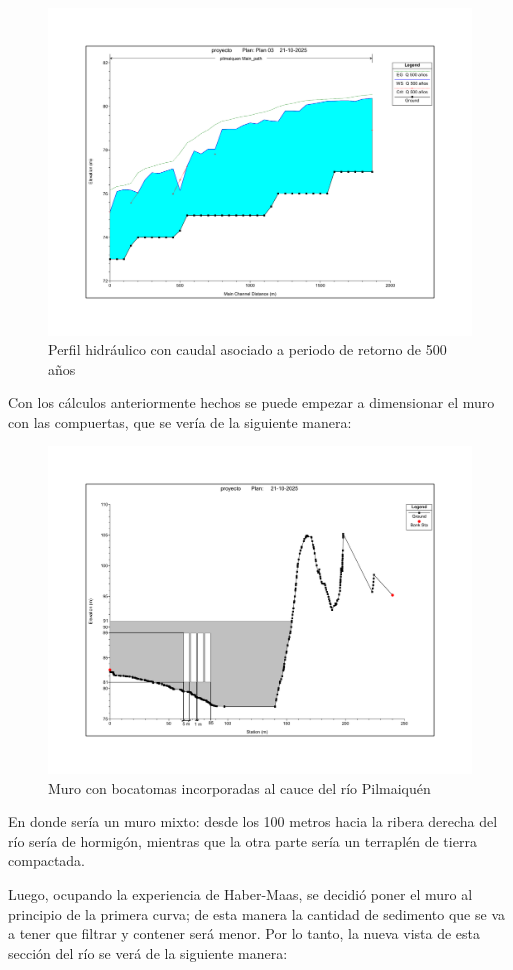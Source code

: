 \documentclass{article} %
\begin{document}
\begin{figure}[H]
    \centering
    \includegraphics[width=0.6\linewidth]{imagenes/perfil_500_sb.pdf}
    \caption{Perfil hidráulico con caudal asociado a periodo de retorno de 500 años}
\end{figure}

Con los cálculos anteriormente hechos se puede empezar a dimensionar el muro con las compuertas, que se vería de la siguiente manera:

\begin{figure}[H]
    \centering
    \includegraphics[width=0.8\linewidth]{imagenes/muro.pdf}
    \caption{Muro con bocatomas incorporadas al cauce del río Pilmaiquén}
\end{figure}

En donde sería un muro mixto: desde los 100 metros hacia la ribera derecha del río sería de hormigón, mientras que la otra parte sería un terraplén de tierra compactada.

Luego, ocupando la experiencia de Haber-Maas, se decidió poner el muro al principio de la primera curva; de esta manera la cantidad de sedimento que se va a tener que filtrar y contener será menor. Por lo tanto, la nueva vista de esta sección del río se verá de la siguiente manera:
\end{document}
